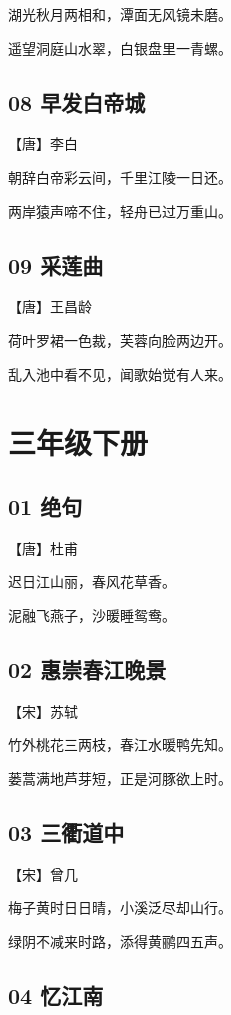 \documentclass[12pt]{article}
\begin{document}
湖光秋月两相和，潭面无风镜未磨。

遥望洞庭山水翠，白银盘里一青螺。

\subsection*{08 早发白帝城}

【唐】李白

朝辞白帝彩云间，千里江陵一日还。

两岸猿声啼不住，轻舟已过万重山。

\subsection*{09 采莲曲}

【唐】王昌龄

荷叶罗裙一色裁，芙蓉向脸两边开。

乱入池中看不见，闻歌始觉有人来。

\newpage

\section*{三年级下册}

\subsection*{01 绝句}

【唐】杜甫

迟日江山丽，春风花草香。

泥融飞燕子，沙暖睡鸳鸯。

\subsection*{02 惠崇春江晚景}

【宋】苏轼

竹外桃花三两枝，春江水暖鸭先知。

蒌蒿满地芦芽短，正是河豚欲上时。

\subsection*{03 三衢道中}

【宋】曾几

梅子黄时日日晴，小溪泛尽却山行。

绿阴不减来时路，添得黄鹂四五声。

\subsection*{04 忆江南}
\end{document}
